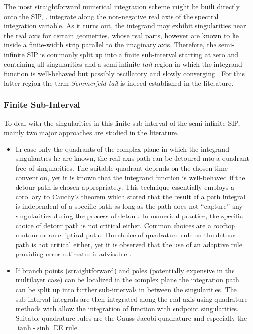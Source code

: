 The most straightforward numerical integration scheme might be built directly
onto the \ac{SIP}, \ie, integrate along the non-negative real axis of the
spectral integration variable.
As it turns out, the integrand may exhibit singularities near the 
real axis for certain geometries, whose real parts, however are known to lie
inside a finite-width strip parallel to the imaginary axis.
Therefore, the semi-infinite \ac{SIP} is commonly split up into a finite
sub-interval starting at zero and containing all singularities and a
semi-infinite \emph{tail} region in which the integrand function is well-behaved
but possibly oscillatory and slowly converging
\cite{mosig1982,Michalski1998,Michalski2016a}.
For this latter region the term \emph{Sommerfeld tail} is indeed established in
the literature.

\subsubsection{Finite Sub-Interval}

To deal with the singularities in this finite sub-interval of the
semi-infinite \ac{SIP}, mainly two major approaches are studied in the
literature.
\begin{itemize}
	\item In case only the quadrants of the complex plane in which the integrand
	singularities lie are known, the real axis path can be detoured into a 
	quadrant free of singularities. The suitable quadrant depends on the
	chosen time convention, yet it is known that the integrand function is
	well-behaved if the detour path is chosen appropriately.
	This technique essentially employs a corollary to Cauchy's theorem which
	stated that the result of a path integral is independent of a specific path
	as long as the path does not \enquote{capture} any singularities during the
	process of detour.
	In numerical practice, the specific choice of detour path is not critical
	either.
	Common choices are a rooftop contour \cite{Michalski2015a} or an
	elliptical \cite{GayBalmaz1997} path.
	The choice of quadrature rule on the detour path is not critical either, yet
	it is observed that the use of an adaptive rule providing error estimates
	is advisable \cite{Michalski2016a}.
	\item If branch points (straightforward) and poles (potentially expensive
	in the multilayer case) can be localized in the complex plane the
	integration path can be split up into further sub-intervals in between the
	singularities.
	The sub-interval integrals are then integrated along the real axis using 
	quadrature methods with allow the integration of function with endpoint
	singularities.
	Suitable quadrature rules are the Gauss-Jacobi quadrature \cite{press2007}
	and especially the  $\tanh$-$\sinh$ \ac{DE} rule
	\cite{takahasi1973,golubovicniciforovic2011,Michalski2016a}.
\end{itemize}






